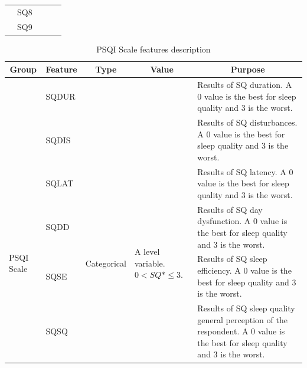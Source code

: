 \documentclass[]{book}
\begin{document}
\begin{table}[ht]
\begin{tabular}{|l|l|l|p{3cm}|p{5cm}|}
        & SQ8                                   &                                    &                                                         &                                                                                                                 \\ \cline{2-2}
        & SQ9                                   &                                    &                                                         &                                                                                                                 \\ \hline
    \end{tabular}
\end{table}

\begin{table}[ht]
    \centering
    \caption{PSQI Scale features description}
    \label{tab:PSQI-Scale-features-description}
    \begin{tabular}{|l|l|l|p{3cm}|p{5cm}|}
        \hline
        \multicolumn{1}{|c|}{\textbf{Group}} & \multicolumn{1}{c|}{\textbf{Feature}} & \multicolumn{1}{c|}{\textbf{Type}} & \multicolumn{1}{c|}{\textbf{Value}}   & \multicolumn{1}{c|}{\textbf{Purpose}}    \\ \hline
        & SQDUR  &   &   & Results of SQ duration. A 0 value is the best for sleep quality and 3 is the worst.                                           \\ \cline{2-2} \cline{5-5} 
        & SQDIS    &      &    & Results of SQ disturbances. A 0 value is the best for sleep quality and 3 is the worst. \\ \cline{2-2} \cline{5-5} 
        \multirow{9}{*}{PSQI Scale} & SQLAT  & \multirow{7}{*}{Categorical}  &  \multirow{7}{3cm}{A level variable. $ 0 < SQ*\leq 3 $.}  & Results of SQ latency. A 0 value is the best for sleep quality and 3 is the worst.    \\ \cline{2-2} \cline{5-5} 
        & SQDD   &    &   & Results of SQ day dysfunction. A 0 value is the best for sleep quality and 3 is the worst. \\ \cline{2-2} \cline{5-5} 
 & SQSE                                  &                                    &                                                       & Results of SQ sleep efficiency. A 0 value is the best for sleep quality and 3 is the worst.                                   \\ \cline{2-2} \cline{5-5} 
        & SQSQ                                  &                                    &                                                       & Results of SQ sleep quality general perception of the respondent. A 0 value is the best for sleep quality and 3 is the worst. \\ \cline{2-2} \cline{5-5} 

\end{tabular}
\end{table}
\end{document}
